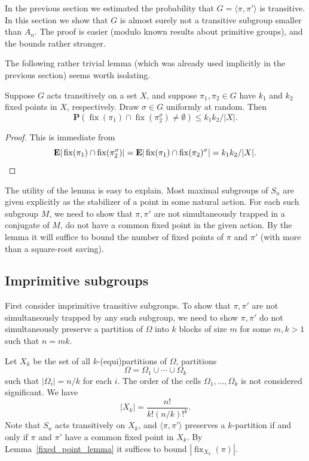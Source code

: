 \documentclass[ALCO,ThmDefs,Unicode,epreuves]{cedram}
\DeclareMathOperator{\fix}{fix}
\renewcommand\P{\mathbf{P}}
\newcommand\E{\mathbf{E}}
\begin{document}
In the previous section we estimated the probability that $G = \langle \pi, \pi'\rangle$ is transitive. In this section we show that $G$ is almost surely not a transitive subgroup smaller than $A_n$. The proof is easier (modulo known results about primitive groups), and the bounds rather stronger.

The following rather trivial lemma (which was already used implicitly in the previous section) seems worth isolating.

\begin{lemma}\label{fixed_point_lemma}
Suppose $G$ acts transitively on a set $X$, and suppose $\pi_1, \pi_2 \in G$ have $k_1$ and $k_2$ fixed points in $X$, respectively. Draw $\sigma \in G$ uniformly at random. Then
\[
 \P(\fix(\pi_1) \cap \fix(\pi_2^\sigma) \neq \emptyset) \leq k_1 k_2/|X|.
\]
\end{lemma}
\begin{proof}
This is immediate from
\[
 \E|\fix(\pi_1) \cap \fix(\pi_2^\sigma)| = \E|\fix(\pi_1) \cap \fix(\pi_2)^\sigma| = k_1 k_2/|X|.\qedhere
\]
\end{proof}

The utility of the lemma is easy to explain. Most maximal subgroups of $S_n$ are given explicitly as the stabilizer of a point in some natural action. For each such subgroup $M$, we need to show that $\pi, \pi'$ are not simultaneously trapped in a conjugate of $M$, \ie do not have a common fixed point in the given action. By the lemma it will suffice to bound the number of fixed points of $\pi$ and $\pi'$ (with more than a square-root saving).

\subsection{Imprimitive subgroups} \label{subsec:imprimitive-subgroups}

First consider imprimitive transitive subgroups. To show that $\pi, \pi'$ are not simultaneously trapped by any such subgroup, we need to show $\pi, \pi'$ do not simultaneously preserve a partition of $\Omega$ into $k$ blocks of size $m$ for some $m,k>1$ such that $n=mk$.

Let $X_k$ be the set of all $k$-(equi)partitions of $\Omega$, \ie partitions
\begin{equation} \label{k-partition}
 \Omega = \Omega_1 \cup \cdots \cup \Omega_k
\end{equation}
such that $|\Omega_i| = n/k$ for each $i$. The order of the cells $\Omega_1, \dots, \Omega_k$ is not considered significant. We have
\[
 |X_k| = \frac{n!}{k! (n/k)!^k}.
\]
Note that $S_n$ acts transitively on $X_k$, and $\langle \pi, \pi'\rangle$ preserves a $k$-partition if and only if $\pi$ and $\pi'$ have a common fixed point in $X_k$. By Lemma~\ref{fixed_point_lemma} it suffices to bound $|\fix_{X_k}(\pi)|$.
\end{document}
